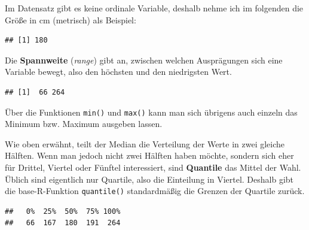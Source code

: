 \documentclass[
]{book}
\newenvironment{Shaded}{\begin{snugshade}}{\end{snugshade}}
\newcommand{\AttributeTok}[1]{\textcolor[rgb]{0.77,0.63,0.00}{#1}}
\newcommand{\ConstantTok}[1]{\textcolor[rgb]{0.00,0.00,0.00}{#1}}
\newcommand{\FunctionTok}[1]{\textcolor[rgb]{0.00,0.00,0.00}{#1}}
\newcommand{\NormalTok}[1]{#1}
\newcommand{\SpecialCharTok}[1]{\textcolor[rgb]{0.00,0.00,0.00}{#1}}
\begin{document}
Im Datensatz gibt es keine ordinale Variable, deshalb nehme ich im folgenden die Größe in cm (metrisch) als Beispiel:

\begin{Shaded}
\end{Shaded}

\begin{verbatim}
## [1] 180
\end{verbatim}

Die \textbf{Spannweite} (\emph{range}) gibt an, zwischen welchen Ausprägungen sich eine Variable bewegt, also den höchsten und den niedrigsten Wert.

\begin{Shaded}
\end{Shaded}

\begin{verbatim}
## [1]  66 264
\end{verbatim}

Über die Funktionen \texttt{min()} und \texttt{max()} kann man sich übrigens auch einzeln das Minimum bzw. Maximum ausgeben lassen.

Wie oben erwähnt, teilt der Median die Verteilung der Werte in zwei gleiche Hälften. Wenn man jedoch nicht zwei Hälften haben möchte, sondern sich eher für Drittel, Viertel oder Fünftel interessiert, sind \textbf{Quantile} das Mittel der Wahl. Üblich sind eigentlich nur Quartile, also die Einteilung in Viertel. Deshalb gibt die base-R-Funktion \texttt{quantile()} standardmäßig die Grenzen der Quartile zurück.

\begin{Shaded}
\end{Shaded}

\begin{verbatim}
##   0%  25%  50%  75% 100% 
##   66  167  180  191  264
\end{verbatim}
\end{document}
